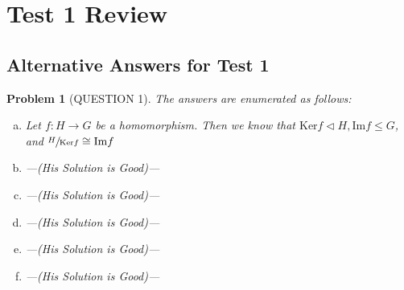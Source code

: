 \documentclass[titlepage]{article}
\theoremstyle{plain}
\newtheorem{problem}[theorem]{Problem}
\theoremstyle{definition}
\theoremstyle{remark}
\theoremstyle{exercise-style}
\numberwithin{equation}{section}
\numberwithin{theorem}{section}
\numberwithin{remark}{section}
\begin{document}
\section{Test 1 Review}

\subsection{Alternative Answers for Test 1}

\begin{problem}[QUESTION 1]
    The answers are enumerated as follows:
    \begin{enumerate}[(a)]
        \item Let $f: H \to G$ be a homomorphism. Then we know that $\mathrm{Ker}f \triangleleft H, \mathrm{Im}f \leqslant G$, and $\sfrac{H}{\mathrm{Ker}f} \cong \mathrm{Im}f$
        \item ---(His Solution is Good)---
        \item ---(His Solution is Good)---
        \item ---(His Solution is Good)---
        \item ---(His Solution is Good)---
        \item ---(His Solution is Good)---
    \end{enumerate}
\end{problem}
\end{document}
